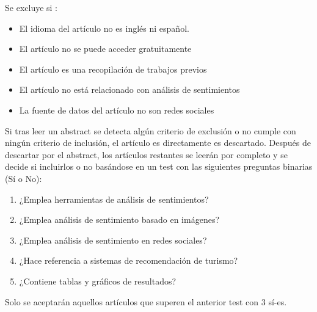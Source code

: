 \begin{enumerate}
    Se excluye si :
    \begin{itemize}
        \item El idioma del artículo no es inglés ni español.
        \item El artículo no se puede acceder gratuitamente
        \item El artículo es una recopilación de trabajos previos
        \item El artículo no está relacionado con análisis de sentimientos
        \item La fuente de datos del artículo no son redes sociales
    \end{itemize}

    Si tras leer un abstract se detecta algún criterio de exclusión o no cumple con ningún criterio de inclusión, el artículo es directamente es descartado. Después de descartar por el abstract, los artículos restantes se leerán por completo y se decide si incluirlos o no basándose en un test con las siguientes preguntas binarias (Sí o No):

    \begin{enumerate}
        \item ¿Emplea herramientas de análisis de sentimientos?
        \item ¿Emplea análisis de sentimiento basado en imágenes?
        \item ¿Emplea análisis de sentimiento en redes sociales?
        \item ¿Hace referencia a sistemas de recomendación de turismo?
        \item ¿Contiene tablas y gráficos de resultados?
    \end{enumerate}
    
    Solo se aceptarán aquellos artículos que superen el anterior test con 3 sí-es.
\end{enumerate}



